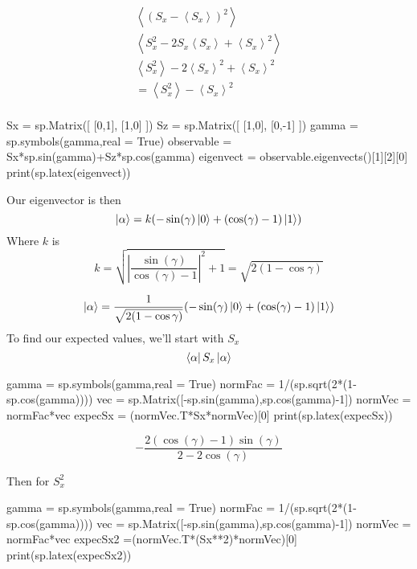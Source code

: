 \documentclass[]{article}
\newenvironment{Shaded}{\begin{snugshade}}{\end{snugshade}}
\newcommand{\NormalTok}[1]{#1}
\begin{document}
\[
\begin{align}
\left<(S_{x}-\left<S_{x}\right>)^{2} \right>  \\
\left<S_{x}^{2}-2S_{x}\left<S_{x}\right>+\left<S_{x}\right>^{2}\right>  \\
\left<S_{x}^{2}\right> -2\left<S_{x}\right>^{2}+\left<S_{x}\right>^{2}\\ 
=\left<S_{x}^{2}\right> -\left<S_{x}\right>^{2}\\
\end{align}
\]

\begin{Shaded}
\begin{Highlighting}[]
\NormalTok{Sx = sp.Matrix([}
\NormalTok{[0,1],}
\NormalTok{[1,0]}
\NormalTok{])}
\NormalTok{Sz = sp.Matrix([}
\NormalTok{[1,0],}
\NormalTok{[0,{-}1]}
\NormalTok{])}
\NormalTok{gamma = sp.symbols(\textquotesingle{}gamma\textquotesingle{},real = True)}
\NormalTok{observable = Sx*sp.sin(gamma)+Sz*sp.cos(gamma)}
\NormalTok{eigenvect = observable.eigenvects()[1][2][0]}
\NormalTok{print(sp.latex(eigenvect))}
\end{Highlighting}
\end{Shaded}

Our eigenvector is then \[
\ket{\alpha}  = k(-\sin(\gamma)\ket{0} +(\cos(\gamma)-1)\ket{1} )
\] Where \(k\) is \[
k=\sqrt{\left|{\frac{\sin{\left(\gamma \right)}}{\cos{\left(\gamma \right)} - 1}}\right|^{2} + 1}=\sqrt{ 2(1-\cos \gamma) }
\]

\[
\ket{\alpha} = \frac{1}{\sqrt{ 2(1-\cos \gamma) }}(-\sin(\gamma)\ket{0} +(\cos(\gamma)-1)\ket{1} )
\] To find our expected values, we'll start with \(S_{x}\) \[
\bra{\alpha} S_{x}\ket{\alpha} 
\]

\begin{Shaded}
\begin{Highlighting}[]
\NormalTok{gamma = sp.symbols(\textquotesingle{}gamma\textquotesingle{},real = True)}
\NormalTok{normFac = 1/(sp.sqrt(2*(1{-}sp.cos(gamma))))}
\NormalTok{vec = sp.Matrix([{-}sp.sin(gamma),sp.cos(gamma){-}1])}
\NormalTok{normVec = normFac*vec}
\NormalTok{expecSx = (normVec.T*Sx*normVec)[0]}
\NormalTok{print(sp.latex(expecSx))}
\end{Highlighting}
\end{Shaded}

\[
- \frac{2 \left(\cos{\left(\gamma \right)} - 1\right) \sin{\left(\gamma \right)}}{2 - 2 \cos{\left(\gamma \right)}}
\]

Then for \(S_{x}^{2}\)

\begin{Shaded}
\begin{Highlighting}[]
\NormalTok{gamma = sp.symbols(\textquotesingle{}gamma\textquotesingle{},real = True)}
\NormalTok{normFac = 1/(sp.sqrt(2*(1{-}sp.cos(gamma))))}
\NormalTok{vec = sp.Matrix([{-}sp.sin(gamma),sp.cos(gamma){-}1])}
\NormalTok{normVec = normFac*vec}
\NormalTok{expecSx2 =(normVec.T*(Sx**2)*normVec)[0]}
\NormalTok{print(sp.latex(expecSx2))}
\end{Highlighting}
\end{Shaded}
\end{document}
